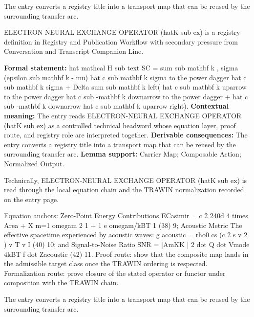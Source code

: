 The entry converts a registry title into a transport map that can be reused by the surrounding transfer arc.
\clearpage


\begingroup\small
{}
ELECTRON-NEURAL EXCHANGE OPERATOR (hatK sub ex) is a registry definition in Registry and Publication Workflow with secondary pressure from Conversation and Transcript Companion Line.

\begingroup\footnotesize\setlength{\emergencystretch}{3em}\sloppy
\textbf{Formal statement:} hat mathcal H sub text SC = sum sub mathbf k , sigma (epsilon sub mathbf k - mu) hat c sub mathbf k sigma to the power dagger hat c sub mathbf k sigma + Delta sum sub mathbf k left( hat c sub mathbf k uparrow to the power dagger hat c sub -mathbf k downarrow to the power dagger + hat c sub -mathbf k downarrow hat c sub mathbf k uparrow right). \textbf{Contextual meaning:} The entry reads ELECTRON-NEURAL EXCHANGE OPERATOR (hatK sub ex) as a controlled technical headword whose equation layer, proof route, and registry role are interpreted together. \textbf{Derivable consequences:} The entry converts a registry title into a transport map that can be reused by the surrounding transfer arc. \textbf{Lemma support:} Carrier Map; Composable Action; Normalized Output.\par
\endgroup

Technically, ELECTRON-NEURAL EXCHANGE OPERATOR (hatK sub ex) is read through the local equation chain and the TRAWIN normalization recorded on the entry page.

Equation anchors: Zero-Point Energy Contributions ECasimir =    c 2 240d 4 times Area + X  m=1  omegam 2 1 + 1 e  omegam/kBT   1 (38) 9; Acoustic Metric The effective spacetime experienced by acoustic waves: g acoustic    = rho0 cs  (c 2 s   v 2 )  v T  v I (40) 10; and Signal-to-Noise Ratio SNR = |AmKK | 2 dot Q dot Vmode   4kBT  f dot Zacoustic (42) 11. Proof route: show that the composite map lands in the admissible target class once the TRAWIN ordering is respected. Formalization route: prove closure of the stated operator or functor under composition with the TRAWIN chain.

The entry converts a registry title into a transport map that can be reused by the surrounding transfer arc.
\endgroup

